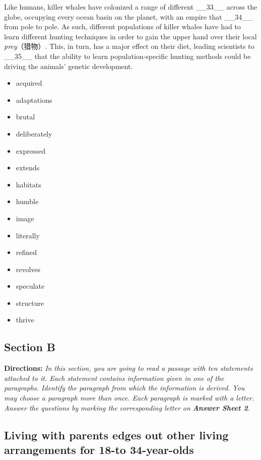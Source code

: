 \documentclass[UTF8,11pt]{ctexart}
\begin{document}
Like humans, killer whales have colonized a range of different \_\_33\_\_ across the globe, occupying every ocean basin on the planet, with an empire that \_\_34\_\_ from pole to pole. As such, different populations of killer whales have had to learn different hunting techniques in order to gain the upper hand over their local\textit{ prey}（猎物）. This, in turn, has a major effect on their diet, leading scientists to \_\_35\_\_ that the ability to learn population-specific hunting methods could be driving the animals’ genetic development.


\begin{itemize}[leftmargin=2em,itemsep=.2em,topsep=.4em]\item[A.] acquired
\item[B.] adaptations
\item[C.] brutal
\item[D.] deliberately
\item[E.] expressed
\item[F.] extends
\item[G.] habitats
\item[H.] humble
\item[I.] image
\item[J.] literally
\item[K.] refined
\item[L.] revolves
\item[M.] speculate
\item[N.] structure
\item[O.] thrive
\end{itemize}

\subsection*{\textbf{Section B}}


\textbf{Directions:}\textit{ In this section, you are going to read a passage with ten statements attached to it. Each statement} \textit{contains information given in one of the paragraphs. Identify the paragraph from which the information is derived.} \textit{You may choose a paragraph more than once. Each paragraph is marked with a letter. Answer the questions by} \textit{marking the corresponding letter on}\textbf{\textit{ Answer Sheet 2}}\textit{.}


\subsection*{\textbf{Living with parents edges out other living arrangements for 18-to 34-year-olds}}
\end{document}
